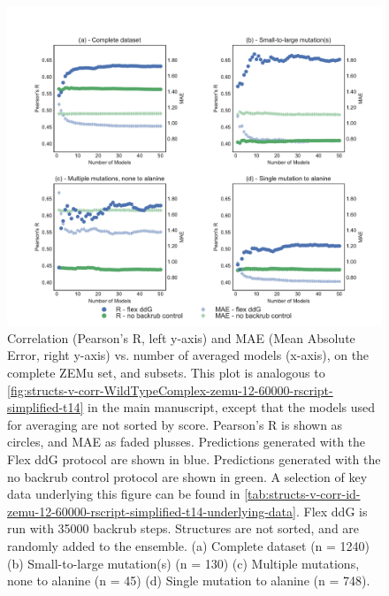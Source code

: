 \begin{figure}
  \includegraphics[width=\textwidth,keepaspectratio]{structs-v-corr-id-zemu-12-60000-rscript-simplified-t14.pdf}
  \caption[]{
    Correlation (Pearson's R, left y-axis) and MAE (Mean Absolute Error, right y-axis) vs. number of averaged models (x-axis), on the complete ZEMu set, and subsets. This plot is analogous to \cref{fig:structs-v-corr-WildTypeComplex-zemu-12-60000-rscript-simplified-t14} in the main manuscript, except that the models used for averaging are not sorted by score.
    Pearson's R is shown as circles, and MAE as faded plusses.
Predictions generated with the Flex ddG protocol are shown in blue.
Predictions generated with the no backrub control protocol are shown in green.
    A selection of key data underlying this figure can be found in \cref{tab:structs-v-corr-id-zemu-12-60000-rscript-simplified-t14-underlying-data}. Flex ddG is run with 35000 backrub steps.
    Structures are not sorted, and are randomly added to the ensemble. 
    (a) Complete dataset (n = 1240)
    (b) Small-to-large mutation(s) (n = 130)
    (c) Multiple mutations, none to alanine (n = 45)
    (d) Single mutation to alanine (n = 748).
  } \label{fig:structs-v-corr-id-zemu-12-60000-rscript-simplified-t14}
\end{figure}

